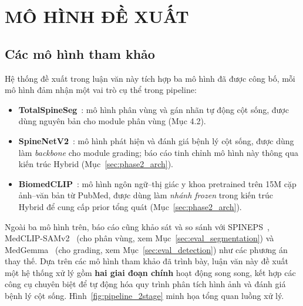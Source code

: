 \chapter{MÔ HÌNH ĐỀ XUẤT}

\section{Các mô hình tham khảo}
Hệ thống đề xuất trong luận văn này tích hợp ba mô hình đã được công bố, mỗi mô hình đảm nhận một vai trò cụ thể trong pipeline:
\begin{itemize}
    \item \textbf{TotalSpineSeg}~\cite{warszawer2025totalspineseg}: mô hình phân vùng và gán nhãn tự động cột sống, được dùng nguyên bản cho module phân vùng (Mục 4.2).

    \item \textbf{SpineNetV2}~\cite{windsor2022spinenetv2}: mô hình phát hiện và đánh giá bệnh lý cột sống, được dùng làm \emph{backbone} cho module grading; báo cáo tinh chỉnh mô hình này thông qua kiến trúc Hybrid (Mục~\ref{sec:phase2_arch}).

    \item \textbf{BiomedCLIP}~\cite{zhang2024biomedclip}: mô hình ngôn ngữ--thị giác y khoa pretrained trên 15M cặp ảnh--văn bản từ PubMed, được dùng làm \emph{nhánh frozen} trong kiến trúc Hybrid để cung cấp prior tổng quát (Mục~\ref{sec:phase2_arch}).
\end{itemize}
Ngoài ba mô hình trên, báo cáo cũng khảo sát và so sánh với SPINEPS~\cite{moller2024spineps}, MedCLIP-SAMv2~\cite{koleilat2025medclipsamv2} (cho phân vùng, xem Mục~\ref{sec:eval_segmentation}) và MedGemma~\cite{google2025medgemma} (cho grading, xem Mục~\ref{sec:eval_detection}) như các phương án thay thế.
Dựa trên các mô hình tham khảo đã trình bày, luận văn này đề xuất một hệ thống xử lý gồm \textbf{hai giai đoạn chính} hoạt động song song, kết hợp các công cụ chuyên biệt để tự động hóa quy trình phân tích hình ảnh và đánh giá bệnh lý cột sống. Hình~\ref{fig:pipeline_2stage} minh họa tổng quan luồng xử lý.

